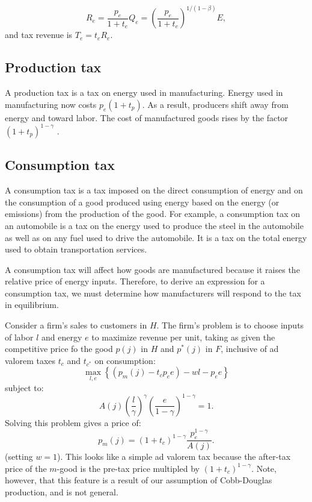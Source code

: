 \documentclass[notitlepage,12pt]{article}
\begin{document}
\begin{equation*}
R_{e}=\frac{p_{e}}{1+t_{e}}Q_{e}=\left( \frac{p_{e}}{1+t_{e}}\right)
^{1/\left( 1-\beta \right) }E,
\end{equation*}%
and tax revenue is $T_{e}=t_{e}R_{e}.$

\subsection{Production tax}

A production tax is a tax on energy used in manufacturing. Energy used in
manufacturing now costs $p_{e}\left( 1+t_{p}\right) $. As a result,
producers shift away from energy and toward labor. The cost of manufactured
goods rises by the factor $\left( 1+t_{p}\right) ^{1-\gamma }$ .

\subsection{Consumption tax}

A consumption tax is a tax imposed on the direct consumption of energy and
on the consumption of a good produced using energy based on the energy (or
emissions) from the production of the good. For example, a consumption tax
on an automobile is a tax on the energy used to produce the steel in the
automobile as well as on any fuel used to drive the automobile. It is a tax
on the total energy used to obtain transportation services.

A consumption tax will affect how goods are manufactured because it raises
the relative price of energy inputs. Therefore, to derive an expression for
a consumption tax, we must determine how manufacturers will respond to the
tax in equilibrium.

Consider a firm's sales to customers in $H$. The firm's problem is to choose
inputs of labor $l$ and energy $e$ to maximize revenue per unit, taking as
given the competitive price fo the good $p\left( j\right) $ in $H$ and $%
p^{\ast }\left( j\right) $ in $F$, inclusive of ad valorem taxes $t_{c}$ and 
$t_{c^{\ast }}$ on consumption: 
\begin{equation*}
\max_{l,e}\left\{ \left( p_{m}(j)-t_{c}p_{e}e\right) -wl-p_{e}e\right\}
\end{equation*}%
subject to:%
\begin{equation*}
A(j)\left( \frac{l}{\gamma }\right) ^{\gamma }\left( \frac{e}{1-\gamma }%
\right) ^{1-\gamma }=1.
\end{equation*}%
Solving this problem gives a price of:%
\begin{equation*}
p_{m}(j)=\left( 1+t_{c}\right) ^{1-\gamma }\frac{p_{e}^{1-\gamma }}{A(j)}.
\end{equation*}%
(setting $w=1$). This looks like a simple ad valorem tax because the
after-tax price of the $m$-good is the pre-tax price multipled by $\left(
1+t_{c}\right) ^{1-\gamma }$. Note, however, that this feature is a result
of our assumption of Cobb-Douglas production, and is not general.
\end{document}
